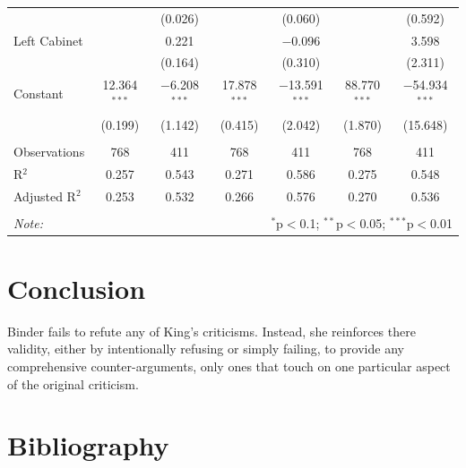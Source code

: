 \documentclass[
  12pt,
]{article}
\begin{document}
\begin{table}[!htbp]
\begin{tabular}{@{\extracolsep{5pt}}lcccccc}
  &  & (0.026) &  & (0.060) &  & (0.592) \\ 
  Left Cabinet &  & 0.221 &  & $-$0.096 &  & 3.598 \\ 
  &  & (0.164) &  & (0.310) &  & (2.311) \\ 
  Constant & 12.364$^{***}$ & $-$6.208$^{***}$ & 17.878$^{***}$ & $-$13.591$^{***}$ & 88.770$^{***}$ & $-$54.934$^{***}$ \\ 
  & (0.199) & (1.142) & (0.415) & (2.042) & (1.870) & (15.648) \\ 
 \hline \\[-1.8ex] 
Observations & 768 & 411 & 768 & 411 & 768 & 411 \\ 
R$^{2}$ & 0.257 & 0.543 & 0.271 & 0.586 & 0.275 & 0.548 \\ 
Adjusted R$^{2}$ & 0.253 & 0.532 & 0.266 & 0.576 & 0.270 & 0.536 \\ 
\hline 
\hline \\[-1.8ex] 
\textit{Note:}  & \multicolumn{6}{r}{$^{*}$p$<$0.1; $^{**}$p$<$0.05; $^{***}$p$<$0.01} \\ 
\end{tabular} 
\end{table}

\hypertarget{conclusion}{%
\section{Conclusion}\label{conclusion}}

Binder fails to refute any of King's criticisms. Instead, she reinforces
there validity, either by intentionally refusing or simply failing, to
provide any comprehensive counter-arguments, only ones that touch on one
particular aspect of the original criticism.

\clearpage
\newpage
\onehalfspace
{}

\thispagestyle{BIB}

\hypertarget{bibliography}{%
\section*{Bibliography}\label{bibliography}}
\end{document}
